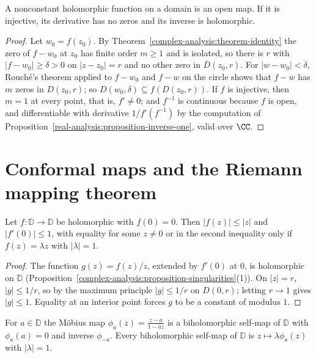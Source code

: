 \begin{theorem}\label{complex-analysis:theorem-open-mapping}
A nonconstant holomorphic function on a domain is an open map. If it is injective, its derivative has no zeros and its inverse is holomorphic.
\end{theorem}

\begin{proof}
Let $w_0 = f(z_0)$. By Theorem~\ref{complex-analysis:theorem-identity} the zero of $f - w_0$ at $z_0$ has finite order $m \geq 1$ and is isolated, so there is $r$ with $|f - w_0| \geq \delta > 0$ on
$|z - z_0| = r$ and no other zero in $\overline{D}(z_0, r)$. For $|w - w_0| < \delta$, Rouch\'e's theorem applied to $f - w_0$ and $f - w$ on the circle shows that $f - w$ has $m$ zeros in $D(z_0, r)$; so
$D(w_0, \delta) \subseteq f(D(z_0, r))$. If $f$ is injective, then $m = 1$ at every point, that is, $f' \neq 0$; and $f^{-1}$ is continuous because $f$ is open, and differentiable with derivative $1/f'(f^{-1})$ by
the computation of Proposition~\ref{real-analysis:proposition-inverse-one}, valid over $\CC$.
\end{proof}

\section{Conformal maps and the Riemann mapping theorem}\label{complex-analysis:section-riemann-mapping}

\begin{lemma}[Schwarz]\label{complex-analysis:lemma-schwarz}
Let $f \colon \mathbb{D} \to \mathbb{D}$ be holomorphic with $f(0) = 0$. Then $|f(z)| \leq |z|$ and $|f'(0)| \leq 1$, with equality for some $z \neq 0$ or in the second inequality only if $f(z) = \lambda z$ with
$|\lambda| = 1$.
\end{lemma}

\begin{proof}
The function $g(z) = f(z)/z$, extended by $f'(0)$ at $0$, is holomorphic on $\mathbb{D}$ (Proposition~\ref{complex-analysis:proposition-singularities}(1)). On $|z| = r$, $|g| \leq 1/r$, so by the maximum
principle $|g| \leq 1/r$ on $D(0, r)$; letting $r \to 1$ gives $|g| \leq 1$. Equality at an interior point forces $g$ to be a constant of modulus $1$.
\end{proof}

\begin{proposition}\label{complex-analysis:proposition-disc-automorphisms}
For $a \in \mathbb{D}$ the M\"obius map $\phi_a(z) = \frac{z - a}{1 - \bar az}$ is a biholomorphic self-map of $\mathbb{D}$ with $\phi_a(a) = 0$ and inverse $\phi_{-a}$. Every biholomorphic self-map of
$\mathbb{D}$ is $z \mapsto \lambda\phi_a(z)$ with $|\lambda| = 1$.
\end{proposition}

